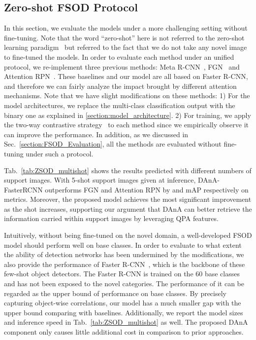 \documentclass[journal]{IEEEtran}
\begin{document}
\subsection{Zero-shot FSOD Protocol}
In this section, we evaluate the models under a more challenging setting without fine-tuning.
Note that the word ``zero-shot'' here is not referred to the zero-shot learning paradigm~\cite{socher2013zero} but referred to the fact that we do not take any novel image to fine-tuned the models.
In order to evaluate each method under an unified protocol, we re-implement three previous methods: Meta R-CNN~\cite{yan2019meta}, FGN~\cite{fan2020fgn} and Attention RPN~\cite{fan2020few}.
These baselines and our model are all based on Faster R-CNN, and therefore we can fairly analyze the impact brought by different attention mechanisms.
Note that we have slight modifications on these methods: 1) For the model architectures, we replace the multi-class classification output with the binary one as explained in \ref{section:model_architecture}. 2) For training, we apply the two-way contrastive strategy~\cite{fan2020few} to each method since we empirically observe it can improve the performance.
In addition, as we discussed in Sec.~\ref{section:FSOD_Evaluation}, all the methods are evaluated without fine-tuning under such a protocol.


Tab.~\ref{tab:ZSOD_multishot} shows the results predicted with different numbers of support images.
With 5-shot support images given at inference, DAnA-FasterRCNN outperforms FGN and Attention RPN by  and  mAP respectively on  metrics.
Moreover, the proposed model achieves the most significant improvement as the shot increases, supporting our argument that DAnA can better retrieve the information carried within support images by leveraging QPA features.


Intuitively, without being fine-tuned on the novel domain, a well-developed FSOD model should perform well on base classes.
In order to evaluate to what extent the ability of detection networks has been undermined by the modifications, we also provide the performance of Faster R-CNN~\cite{ren2015faster}, which is the backbone of these few-shot object detectors. 
The Faster R-CNN is trained on the 60 base classes and has not been exposed to the novel categories.
The performance of it can be regarded as the upper bound of performance on base classes.
By precisely capturing object-wise correlations, our model has a much smaller gap with the upper bound comparing with baselines.
Additionally, we report the model sizes and inference speed in Tab.~\ref{tab:ZSOD_multishot} as well.
The proposed DAnA component only causes little additional cost in comparison to prior approaches.
\end{document}
